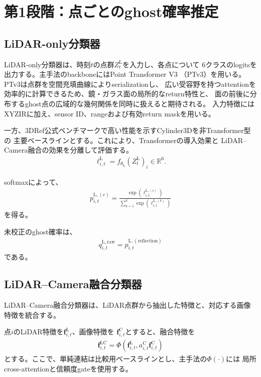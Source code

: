 \documentclass[uplatex,a4paper,11pt]{jsarticle}
\begin{document}
\section{第1段階：点ごとのghost確率推定}

\subsection{LiDAR-only分類器}

LiDAR-only分類器は、時刻$t$の点群$Z_t^{\mathrm{L}}$を入力し、各点について
6クラスのlogitsを出力する。主手法のbackboneにはPoint Transformer V3
（PTv3）\cite{wu2024_ptv3}を用いる。PTv3は点群を空間充填曲線によりserializationし、
広い受容野を持つattentionを効率的に計算できるため、鏡・ガラス面の局所的なreturn特性と、
面の前後に分布するghost点の広域的な幾何関係を同時に扱えると期待される。
入力特徴にはXYZIRに加え、sensor ID、rangeおよび有効return maskを用いる。

一方、3DRef公式ベンチマークで高い性能を示すCylinder3Dを非Transformer型の
主要ベースラインとする\cite{zhao2024_3dref}。これにより、Transformerの導入効果と
LiDAR--Camera融合の効果を分離して評価する。
\begin{align}
  \bm{\ell}_{i,t}^{\mathrm{L}}
  =
  f_{\theta_{\mathrm{L}}}
  \left(
    Z_t^{\mathrm{L}}
  \right)_i
  \in
  \mathbb{R}^{6}.
\end{align}

softmaxによって、
\begin{align}
  p_{i,t}^{\mathrm{L},(c)}
  =
  \frac{
    \exp
    \left(
      \ell_{i,t}^{\mathrm{L},(c)}
    \right)
  }{
    \sum_{k=1}^{6}
    \exp
    \left(
      \ell_{i,t}^{\mathrm{L},(k)}
    \right)
  }
\end{align}
を得る。

未校正のghost確率は、
\begin{align}
  q_{i,t}^{\mathrm{L,raw}}
  =
  p_{i,t}^{\mathrm{L},(\mathrm{reflection})}
\end{align}
である。

\subsection{LiDAR--Camera融合分類器}

LiDAR--Camera融合分類器は、LiDAR点群から抽出した特徴と、対応する画像特徴を統合する。

点$i$のLiDAR特徴を$\bm{f}_{i,t}^{\mathrm{L}}$、画像特徴を
$\bm{f}_{i,t}^{\mathrm{C}}$とすると、融合特徴を
\begin{align}
  \bm{f}_{i,t}^{\mathrm{LC}}
  =
  \Phi
  \left(
    \bm{f}_{i,t}^{\mathrm{L}},
    a_{i,t}^{\mathrm{C}}
    \bm{f}_{i,t}^{\mathrm{C}}
  \right)
\end{align}
とする。ここで、単純連結は比較用ベースラインとし、主手法の$\Phi(\cdot)$には
局所cross-attentionと信頼度gateを使用する。
\end{document}
